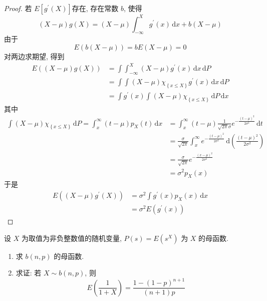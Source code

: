 \documentclass[../main.tex]{subfiles}
\begin{document}
\begin{proof}
   若 \(  E\left[ g^{\prime} \left( X \right)  \right]   \)存在, 存在常数 \(  b  \), 使得  \[
  \left( X-\mu  \right)   g\left( X \right)=  \left( X-\mu  \right) \int_{-\infty}^{X}g^{\prime} \left( x \right) \,\mathrm{d} x + b\left( X-\mu  \right) 
    \]由于 \[
    E\left( b\left( X-\mu  \right)  \right)= bE\left( X-\mu  \right)= 0  
    \]对两边求期望, 得到 \[
    \begin{aligned}
    E\left(\left( X-\mu  \right)  g\left( X \right)  \right)&= \int  \int_{-\infty}^{X}\left( X-\mu  \right)g^{\prime} \left( x \right)\,\mathrm{d} x \,\mathrm{d} P  \\ 
     &=  \int \int\left( X-\mu  \right)\chi _{\left\{ x\le X \right\}}g^{\prime} \left( x \right)\,\mathrm{d} x\,\mathrm{d} P\\ 
      &=  \int g^{\prime} \left( x \right)   \int \left( X-\mu  \right)\chi _{\left\{ x\le X \right\}} \,\mathrm{d} P\,\mathrm{d} x
    \end{aligned}
    \] 其中 \[
   \begin{aligned}
    \int \left( X-\mu  \right) \chi _{\left\{ x\le X \right\}}\,\mathrm{d} P= \int_{x}^{\infty}\left( t-\mu  \right)p_{X}\left( t \right)\,\mathrm{d} x  & =  \int_{x}^{\infty}\left( t-\mu  \right)\frac{1 }{\sqrt{2 \pi } \sigma  }e^{-\frac{\left( t-\mu  \right)^{2}  }{2 \sigma ^{2} } }\,\mathrm{d} t   \\ 
     &=  \frac{ \sigma  }{\sqrt{2 \pi } } \int_{x}^{\infty}e^{-\frac{\left( t-\mu  \right)^{2}  }{2 \sigma ^{2} } }\,\mathrm{d}  \left( \frac{\left( t-\mu  \right)^{2}  }{2 \sigma ^{2} }  \right)  \\ 
      &= \frac{ \sigma  }{\sqrt{2 \pi } } e^{-\frac{\left( x-\mu  \right)^{2}  }{2 \sigma ^{2} } }\\ 
       &=  \sigma ^{2} p_{X}\left( x \right) 
   \end{aligned}
    \]于是 \[
    \begin{aligned}
    E\left( \left( X-\mu  \right)g^{\prime} \left( X \right)   \right)&=  \sigma ^{2}\int g^{\prime} \left( x \right) p_{X}\left( x \right)\,\mathrm{d} x \\ 
     &=  \sigma ^{2}E\left( g^{\prime} \left( x \right)  \right)  
    \end{aligned} 
    \]
\end{proof}
\begin{exercise}{}{}
设 $X$ 为取值为非负整数值的随机变量, $P(s) = E(s^X)$ 为 $X$ 的母函数.
\begin{enumerate}
    \item 求 $b(n,p)$ 的母函数.
    \item 求证: 若 $X \sim b(n,p)$, 则
    \[
    E\left(\frac{1}{1+X}\right) = \frac{1-(1-p)^{n+1}}{(n+1)p}
    \]
\end{enumerate}
\end{exercise}
\end{document}
